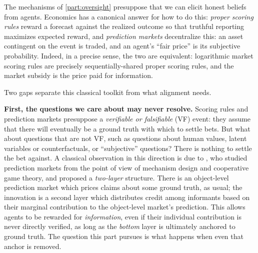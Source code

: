 
\begin{draftblock}
\noindent The mechanisms of \cref{part:oversight} presuppose that we can elicit honest beliefs from agents. Economics has a canonical answer for how to do this: \emph{proper scoring rules} \citep{goodRationalDecisions1952, savageElicitationPersonalProbabilities1971, gneitingStrictlyProperScoring2007} reward a forecast against the realized outcome so that truthful reporting maximizes expected reward, and \emph{prediction markets} \citep{hansonLogarithmicMarketScoring2002, hansonCombinatorialInformationMarket2003} decentralize this: an asset contingent on the event is traded, and an agent's ``fair price'' is its subjective probability. Indeed, in a precise sense, the two are equivalent: logarithmic market scoring rules are precisely sequentially-shared proper scoring rules, and the market subsidy is the price paid for information.

Two gaps separate this classical toolkit from what alignment needs.

\textbf{First, the questions we care about may never resolve.} Scoring rules and prediction markets presuppose a \emph{verifiable or falsifiable} (VF) event: they assume that there will eventually be a ground truth with which to settle bets. But what about questions that are not VF, such as questions about human values, latent variables or counterfactuals, or ``subjective'' questions? There is nothing to settle the bet against. A classical observation in this direction is due to \citet{conitzerPredictionMarketsMechanism2012}, who studied prediction markets from the point of view of mechanism design and cooperative game theory, and proposed a \emph{two-layer} structure. There is an object-level prediction market which prices claims about some ground truth, as usual; the innovation is a second layer which distributes credit among informants based on their marginal contribution to the object-level market's prediction. This allows agents to be rewarded for \emph{information}, even if their individual contribution is never directly verified, as long as the \emph{bottom} layer is ultimately anchored to ground truth. The question this part pursues is what happens when even that anchor is removed.


\end{draftblock}

